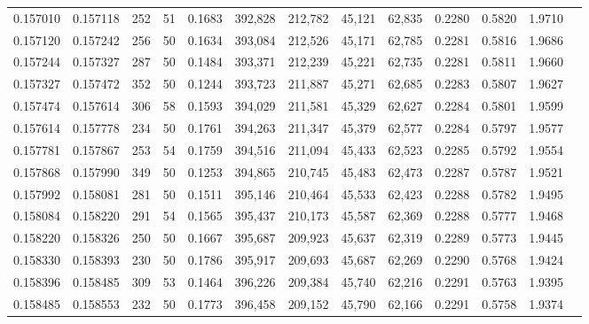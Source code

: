\begin{tabular}{rrrrrrrrrrrrr}
0.157010 & 0.157118 &   252 &  51 &                                     0.1683 & 392,828 & 212,782 &  45,121 &  62,835 & 0.2280 & 0.5820 & 1.9710 \\
0.157120 & 0.157242 &   256 &  50 &                                     0.1634 & 393,084 & 212,526 &  45,171 &  62,785 & 0.2281 & 0.5816 & 1.9686 \\
0.157244 & 0.157327 &   287 &  50 &                                     0.1484 & 393,371 & 212,239 &  45,221 &  62,735 & 0.2281 & 0.5811 & 1.9660 \\
0.157327 & 0.157472 &   352 &  50 &                                     0.1244 & 393,723 & 211,887 &  45,271 &  62,685 & 0.2283 & 0.5807 & 1.9627 \\
0.157474 & 0.157614 &   306 &  58 &                                     0.1593 & 394,029 & 211,581 &  45,329 &  62,627 & 0.2284 & 0.5801 & 1.9599 \\
0.157614 & 0.157778 &   234 &  50 &                                     0.1761 & 394,263 & 211,347 &  45,379 &  62,577 & 0.2284 & 0.5797 & 1.9577 \\
0.157781 & 0.157867 &   253 &  54 &                                     0.1759 & 394,516 & 211,094 &  45,433 &  62,523 & 0.2285 & 0.5792 & 1.9554 \\
0.157868 & 0.157990 &   349 &  50 &                                     0.1253 & 394,865 & 210,745 &  45,483 &  62,473 & 0.2287 & 0.5787 & 1.9521 \\
0.157992 & 0.158081 &   281 &  50 &                                     0.1511 & 395,146 & 210,464 &  45,533 &  62,423 & 0.2288 & 0.5782 & 1.9495 \\
0.158084 & 0.158220 &   291 &  54 &                                     0.1565 & 395,437 & 210,173 &  45,587 &  62,369 & 0.2288 & 0.5777 & 1.9468 \\
0.158220 & 0.158326 &   250 &  50 &                                     0.1667 & 395,687 & 209,923 &  45,637 &  62,319 & 0.2289 & 0.5773 & 1.9445 \\
0.158330 & 0.158393 &   230 &  50 &                                     0.1786 & 395,917 & 209,693 &  45,687 &  62,269 & 0.2290 & 0.5768 & 1.9424 \\
0.158396 & 0.158485 &   309 &  53 &                                     0.1464 & 396,226 & 209,384 &  45,740 &  62,216 & 0.2291 & 0.5763 & 1.9395 \\
0.158485 & 0.158553 &   232 &  50 &                                     0.1773 & 396,458 & 209,152 &  45,790 &  62,166 & 0.2291 & 0.5758 & 1.9374 \\

\end{tabular}
